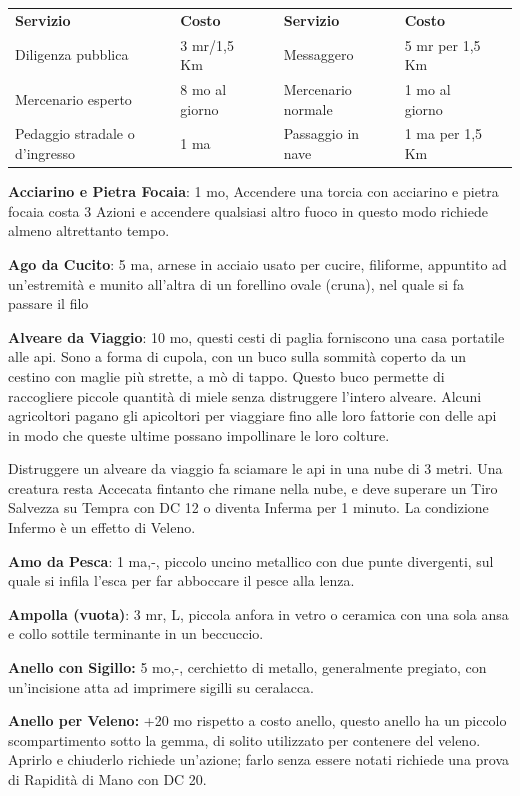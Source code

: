 \documentclass[a4paper,11pt,twoside,openany]{book}
\begin{document}
\begin{tabularx}{0.95\textwidth}{XllXll}
	\textbf{Servizio} & \textbf{Costo} & & \textbf{Servizio} & \textbf{Costo}  & \\
	Diligenza pubblica& 3 mr/1,5 Km    & & Messaggero  & 5 mr per 1,5 Km & \\
	Mercenario esperto& 8 mo al giorno & & Mercenario normale& 1 mo al giorno  & \\
	Pedaggio stradale o d’ingresso& 1 ma& & Passaggio in nave & 1 ma per 1,5 Km & \\
\end{tabularx}


\bigskip


\textbf{Acciarino e Pietra Focaia}: 1 mo, Accendere una torcia con acciarino e pietra focaia costa 3 Azioni e accendere qualsiasi altro fuoco in questo modo richiede almeno altrettanto tempo.

\textbf{Ago da Cucito}: 5 ma, arnese in acciaio usato per cucire, filiforme, appuntito ad un'estremità e munito all'altra di un forellino ovale (cruna), nel quale si fa passare il filo

\textbf{Alveare da Viaggio}: 10 mo, questi cesti di paglia forniscono una casa portatile alle api. Sono a forma di cupola, con un buco sulla sommità coperto da un cestino con maglie più strette, a mò di tappo. Questo buco permette di raccogliere piccole quantità di miele senza distruggere l'intero alveare. Alcuni agricoltori pagano gli apicoltori per viaggiare fino alle loro fattorie con delle api in modo che queste ultime possano impollinare le loro colture.

Distruggere un alveare da viaggio fa sciamare le api in una nube di 3 metri. Una creatura resta Accecata fintanto che rimane nella nube, e deve superare un Tiro Salvezza su Tempra con DC 12 o diventa Inferma per 1 minuto. La condizione Infermo è un effetto di Veleno.

\textbf{Amo da Pesca}: 1 ma,-, piccolo uncino metallico con due punte divergenti, sul quale si infila l'esca per far abboccare il pesce alla lenza.

\textbf{Ampolla (vuota)}: 3 mr, L, piccola anfora in vetro o ceramica con una sola ansa e collo sottile terminante in un beccuccio.

\textbf{Anello con Sigillo:} 5 mo,-, cerchietto di metallo, generalmente pregiato, con un'incisione atta ad imprimere sigilli su ceralacca.

\textbf{Anello per Veleno:} +20 mo rispetto a costo anello, questo anello ha un piccolo scompartimento sotto la gemma, di solito utilizzato per contenere del veleno. Aprirlo e chiuderlo richiede un'azione; farlo senza essere notati richiede una prova di Rapidità di Mano con DC 20.
\end{document}
